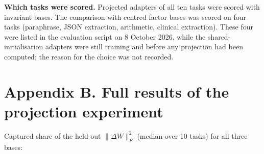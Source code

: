 \documentclass[
  11pt,
]{article}
\begin{document}
\textbf{Which tasks were scored.} Projected adapters of all ten tasks
were scored with invariant bases. The comparison with centred factor
bases was scored on four tasks (paraphrase, JSON extraction, arithmetic,
clinical extraction). These four were listed in the evaluation script on
8 October 2026, while the shared-initialisation adapters were still
training and before any projection had been computed; the reason for the
choice was not recorded.

\section{Appendix B. Full results of the projection
experiment}\label{appendix-b.-full-results-of-the-projection-experiment}

Captured share of the held-out \(\|\Delta W\|_F^2\) (median over 10
tasks) for all three bases:
\end{document}
